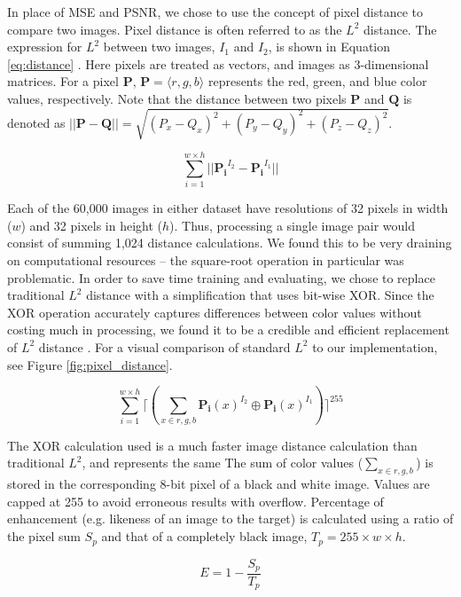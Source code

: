\documentclass[letterpaper]{article} %
\begin{document}
In place of MSE and PSNR, we chose to use the concept of pixel distance
to compare two images.
Pixel distance is often referred to as the $L^2$ distance.
The expression for $L^2$ between two images, $I_1$ and $I_2$, is
shown in Equation \ref{eq:distance} \cite{graphics}.
Here pixels are treated as vectors, and images as
3-dimensional matrices.
For a pixel $\mathbf{P}$,
$\mathbf{P} = \langle r,g,b \rangle$ represents
the red, green, and blue color values,
respectively.
Note that the distance between
two pixels $\mathbf{P}$ and $\mathbf{Q}$ is denoted as
$||\mathbf{P} - \mathbf{Q}|| =
\sqrt{(P_x - Q_x)^2 + (P_y - Q_y)^2 + (P_z - Q_z)^2}$.

\begin{equation}
\label{eq:distance}
\sum_{i=1}^{w \times h}||\mathbf{P_i}^{I_2} - \mathbf{P_i}^{I_1}||
\end{equation}

Each of the 60,000 images in either dataset have resolutions of
32 pixels in width ($w$) and 32 pixels in height ($h$).
Thus, processing a single image pair would consist of summing 1,024
distance calculations.
We found this to be very draining on computational resources --
the square-root operation in particular was problematic.
In order to save time training and evaluating, we chose to replace
traditional $L^2$ distance with a simplification that uses bit-wise XOR.
Since the XOR operation accurately captures differences between color
values without costing much in processing,
we found it to be a credible and efficient replacement of $L^2$ distance
\cite{image_analysis}.
For a visual comparison of standard $L^2$ to our implementation,
see Figure \ref{fig:pixel_distance}.

\begin{equation}
\label{eq:xor}
\sum_{i=1}^{w \times h}\lceil(\sum_{x \in r,g,b}\mathbf{P_i}(x)^{I_2} \oplus \mathbf{P_i}(x)^{I_1})\rceil^{255}
\end{equation}

The XOR calculation used is a much faster image distance calculation than
traditional $L^2$, and represents the same 
The sum of color values ($\sum_{x \in r,g,b}$) is stored in
the corresponding 8-bit pixel of a black and white image.
Values are capped at 255 to avoid erroneous results with overflow.
Percentage of enhancement (e.g. likeness of an image to the target)
is calculated using a ratio of the pixel sum $S_p$
and that of a completely black image, $T_p = 255 \times w \times h$.

\begin{equation}
\label{eq:enhancement}
E = 1 - \frac{S_p}{T_p}
\end{equation}
\end{document}
